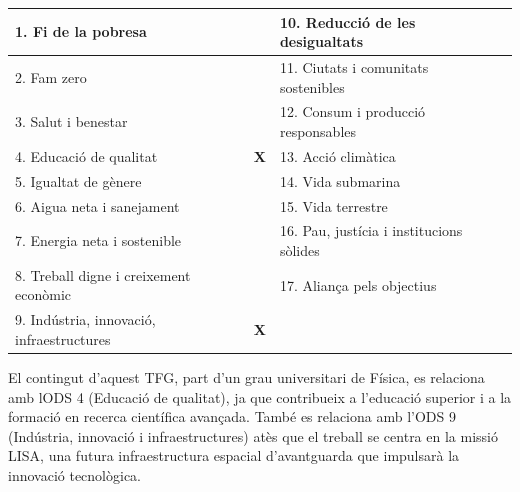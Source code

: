 \documentclass[twocolumn]{revtex4-2}
\begin{document}
\begin{center}
    \small
    \renewcommand{\arraystretch}{1.2}
  
    \begin{tabular}{|l|c|l|c|}
        \hline
        1. Fi de la pobresa & & 10. Reducció de les desigualtats & \\ \hline
        2. Fam zero & & 11. Ciutats i comunitats sostenibles & \\ \hline
        3. Salut i benestar & & 12. Consum i producció responsables & \\ \hline
        4. Educació de qualitat & \textbf{X} & 13. Acció climàtica & \\ \hline
        5. Igualtat de gènere & & 14. Vida submarina & \\ \hline
        6. Aigua neta i sanejament & & 15. Vida terrestre & \\ \hline
        7. Energia neta i sostenible & & 16. Pau, justícia i institucions sòlides & \\ \hline
        8. Treball digne i creixement econòmic & & 17. Aliança pels objectius & \\ \hline
        9. Indústria, innovació, infraestructures & \textbf{X} & & \\ \hline
    \end{tabular}
\end{center}

\vspace{0.2cm}

\noindent El contingut d'aquest TFG, part d'un grau universitari de Física, es relaciona amb lODS 4 (Educació de qualitat), ja que contribueix a l'educació superior i a la formació en recerca científica avançada. També es relaciona amb l'ODS 9 (Indústria, innovació i infraestructures) atès que el treball se centra en la missió LISA, una futura infraestructura espacial d'avantguarda que impulsarà la innovació tecnològica.

\vspace{0.5cm}
\end{document}
